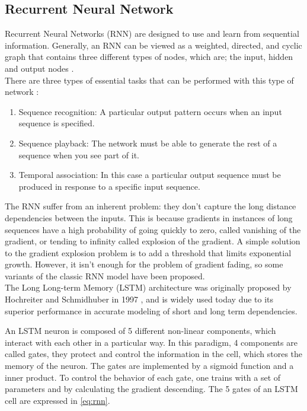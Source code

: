 \documentclass[conference]{IEEEtran}
\begin{document}
\subsection{Recurrent Neural Network}

Recurrent Neural Networks (RNN) are designed to use and learn from sequential information. Generally, an RNN can be viewed as a weighted, directed, and cyclic graph that contains three different types of nodes, which are; the input, hidden and output nodes \cite{zhang2016architectural}.\\

There are three types of essential tasks that can be performed with this type of network \cite{bonet2007redes}:

\begin{enumerate}
	\item Sequence recognition: A particular output pattern occurs when an input sequence is specified.
	
	\item Sequence playback: The network must be able to generate the rest of a sequence when you see part of it.
	
	\item Temporal association: In this case a particular output sequence must be produced in response to a specific input sequence.\\
\end{enumerate}

The RNN suffer from an inherent problem: they don't capture the long distance dependencies between the inputs. This is because gradients in instances of long sequences have a high probability of going quickly to zero, called vanishing of the gradient, or tending to infinity called explosion of the gradient.
A simple solution to the gradient explosion problem is to add a threshold that limits exponential growth. However, it isn't enough for the problem of gradient fading, so some variants of the classic RNN model have been proposed.\\

The Long Long-term Memory (LSTM) architecture was originally proposed by Hochreiter and Schmidhuber in 1997 \cite{hochreiter1997long}, and is widely used today due to its superior performance in accurate modeling of short and long term dependencies.

An LSTM neuron is composed of 5 different non-linear components, which interact with each other in a particular way. In this paradigm, 4 components are called gates, they protect and control the information in the cell, which stores the memory of the neuron. The gates are implemented by a sigmoid function and a inner product. To control the behavior of each gate, one trains with a set of parameters and by calculating the gradient descending. The 5 gates of an LSTM cell are expressed in \eqref{eq:rnn}.
\end{document}

